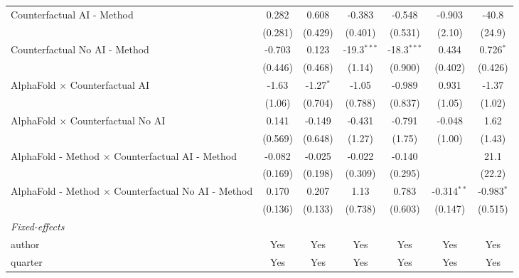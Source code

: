 \begin{tabular}{lcccccc}
   Counterfactual AI - Method                                 & 0.282   & 0.608        & -0.383        & -0.548        & -0.903        & -40.8\\   
                                                              & (0.281) & (0.429)      & (0.401)       & (0.531)       & (2.10)        & (24.9)\\   
   Counterfactual No AI - Method                              & -0.703  & 0.123        & -19.3$^{***}$ & -18.3$^{***}$ & 0.434         & 0.726$^{*}$\\   
                                                              & (0.446) & (0.468)      & (1.14)        & (0.900)       & (0.402)       & (0.426)\\   
   AlphaFold $\times$ Counterfactual AI                       & -1.63   & -1.27$^{*}$  & -1.05         & -0.989        & 0.931         & -1.37\\   
                                                              & (1.06)  & (0.704)      & (0.788)       & (0.837)       & (1.05)        & (1.02)\\   
   AlphaFold $\times$ Counterfactual No AI                    & 0.141   & -0.149       & -0.431        & -0.791        & -0.048        & 1.62\\   
                                                              & (0.569) & (0.648)      & (1.27)        & (1.75)        & (1.00)        & (1.43)\\   
   AlphaFold - Method $\times$ Counterfactual AI - Method     & -0.082  & -0.025       & -0.022        & -0.140        &               & 21.1\\   
                                                              & (0.169) & (0.198)      & (0.309)       & (0.295)       &               & (22.2)\\   
   AlphaFold - Method $\times$ Counterfactual No AI - Method  & 0.170   & 0.207        & 1.13          & 0.783         & -0.314$^{**}$ & -0.983$^{*}$\\   
                                                              & (0.136) & (0.133)      & (0.738)       & (0.603)       & (0.147)       & (0.515)\\   
   \midrule
   \emph{Fixed-effects}\\
   author                                                     & Yes     & Yes          & Yes           & Yes           & Yes           & Yes\\  
   quarter                                                    & Yes     & Yes          & Yes           & Yes           & Yes           & Yes\\  

\end{tabular}
